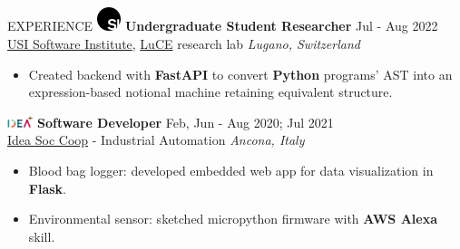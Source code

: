 \documentclass{cv} %
\def\intraexpvspace{0.15cm}
\begin{document}
\begin{minipage}[b][0.9\paperheight][t]{0.7\linewidth}
\begin{rSection}{EXPERIENCE}
        \includegraphics[width=0.7cm, trim={0cm 10cm 0cm 0cm}]{si-icon.jpg}
        \hspace*{0cm}\textbf{Undergraduate Student Researcher} \hfill Jul - Aug 2022\\
        \hspace*{0.85cm}\href{https://www.si.usi.ch/}{USI Software Institute},
        \href{https://luce.si.usi.ch/team/}{LuCE} research lab
        \hfill \textit{Lugano, Switzerland}
        \begin{itemize}
            \item Created backend with \textbf{FastAPI} to convert \textbf{Python} programs' AST
                  into an expression-based notional machine retaining equivalent structure.
        \end{itemize}
        \vspace{\intraexpvspace}
        \vspace{\intraexpvspace}

        \includegraphics[width=0.75cm, trim={0cm 1.5cm 0cm 0cm}]{idea-icon.png}
        \textbf{Software Developer} \hfill Feb, Jun - Aug 2020; Jul 2021\\
        \hspace*{0.85cm}\href{https://idea-on-line.it/}{Idea Soc Coop} - Industrial Automation
        \hfill \textit{Ancona, Italy}
        \begin{itemize}
            \item Blood bag logger:
                  developed embedded web app for data visualization in \textbf{Flask}.

            \item Environmental sensor:
                  sketched micropython firmware with \textbf{AWS Alexa} skill.
        \end{itemize}
        \vspace{\intraexpvspace}
        \vspace{\intraexpvspace}


\end{rSection}
\end{minipage}
\end{document}
